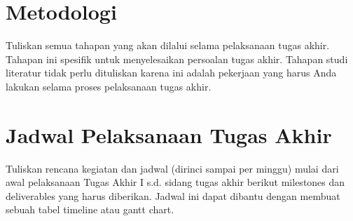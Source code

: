 \section{Metodologi}

Tuliskan semua tahapan yang akan dilalui selama pelaksanaan tugas akhir.
Tahapan ini spesifik untuk menyelesaikan persoalan tugas akhir. Tahapan studi
literatur tidak perlu dituliskan karena ini adalah pekerjaan yang harus Anda
lakukan selama proses pelaksanaan tugas akhir.

\section{Jadwal Pelaksanaan Tugas Akhir}

Tuliskan rencana kegiatan dan jadwal (dirinci sampai per minggu) mulai dari
awal pelaksanaan Tugas Akhir I s.d. sidang tugas akhir berikut milestones dan
deliverables yang harus diberikan. Jadwal ini dapat dibantu dengan membuat
sebuah tabel timeline atau gantt chart.
